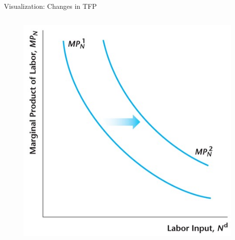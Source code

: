 \documentclass[11pt,aspectratio=43]{beamer} \usepackage[utf8]{inputenc}
\theoremstyle{definition}
\begin{document}
\begin{frame}{Visualization: Changes in TFP}
\begin{columns}
\begin{column}{0.5\textwidth}
\begin{figure}
            \includegraphics[width=\textwidth]{./figures/Figure4_17.jpg}
        \end{figure}
    \end{column}
\end{columns}

\end{frame}
\end{document}
